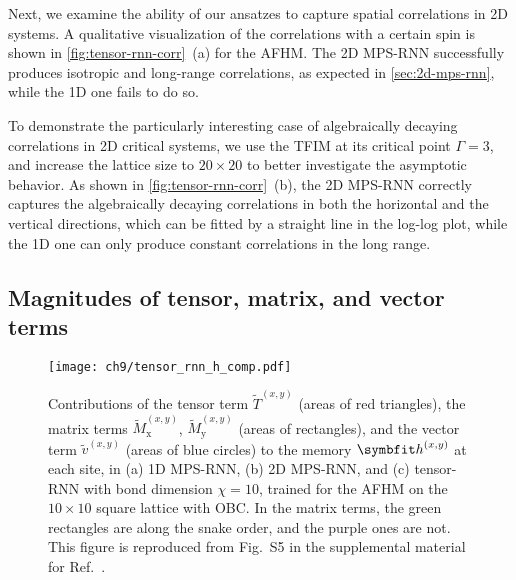 Next, we examine the ability of our ansatzes to capture spatial correlations in 2D systems. A qualitative visualization of the correlations with a certain spin is shown in \cref{fig:tensor-rnn-corr}~(a) for the AFHM. The 2D MPS-RNN successfully produces isotropic and long-range correlations, as expected in \cref{sec:2d-mps-rnn}, while the 1D one fails to do so.

To demonstrate the particularly interesting case of algebraically decaying correlations in 2D critical systems, we use the TFIM at its critical point $\Gamma = 3$, and increase the lattice size to $20 \times 20$ to better investigate the asymptotic behavior. As shown in \cref{fig:tensor-rnn-corr}~(b), the 2D MPS-RNN correctly captures the algebraically decaying correlations in both the horizontal and the vertical directions, which can be fitted by a straight line in the log-log plot, while the 1D one can only produce constant correlations in the long range.

\subsection{Magnitudes of tensor, matrix, and vector terms}
\label{sec:tensor-rnn-magnitude}

\begin{figure}[htb]
\centering
\texttt{[image: ch9/tensor\_rnn\_h\_comp.pdf]}
\caption[Contributions of tensor, matrix, and vector terms in tensor-RNN]{
Contributions of the tensor term $\tilde{T}^{(x, y)}$ (areas of {\color[HTML]{d62728} red} triangles), the matrix terms $\tilde{M}^{(x, y)}_\text{x}$, $\tilde{M}^{(x, y)}_\text{y}$ (areas of rectangles), and the vector term $\tilde{v}^{(x, y)}$ (areas of {\color[HTML]{1f77b4} blue} circles) to the memory $\vh^{(x, y)}$ at each site, in (a) 1D MPS-RNN, (b) 2D MPS-RNN, and (c) tensor-RNN with bond dimension $\chi = 10$, trained for the AFHM on the $10 \times 10$ square lattice with OBC.
In the matrix terms, the {\color[HTML]{2ca02c} green} rectangles are along the snake order, and the {\color[HTML]{9467bd} purple} ones are not.
This figure is reproduced from Fig.~S5 in the supplemental material for Ref.~\cite{wu2023tensor}.
}
\label{fig:tensor-rnn-h-comp}
\end{figure}

